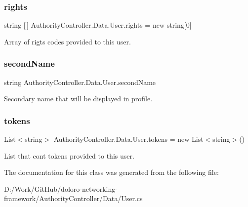 \mbox{\label{class_authority_controller_1_1_data_1_1_user_a750e743023fd2e3b7d22cffd1729c4d3}} 
\subsubsection{\texorpdfstring{rights}{rights}}
{\footnotesize\ttfamily string \mbox{[}$\,$\mbox{]} Authority\+Controller.\+Data.\+User.\+rights = new string\mbox{[}0\mbox{]}}



Array of rigts\textquotesingle{} codes provided to this user. 

\mbox{\label{class_authority_controller_1_1_data_1_1_user_a7e06ede3b1eb9d24537f530d84129931}} 
\subsubsection{\texorpdfstring{second\+Name}{secondName}}
{\footnotesize\ttfamily string Authority\+Controller.\+Data.\+User.\+second\+Name}



Secondary name that will be displayed in profile. 

\mbox{\label{class_authority_controller_1_1_data_1_1_user_a881f9d9beaa89819daf95838bdc5a984}} 
\subsubsection{\texorpdfstring{tokens}{tokens}}
{\footnotesize\ttfamily List$<$string$>$ Authority\+Controller.\+Data.\+User.\+tokens = new List$<$string$>$()}



List that cont tokens provided to this user. 



The documentation for this class was generated from the following file\+:\begin{DoxyCompactItemize}
\item 
D\+:/\+Work/\+Git\+Hub/doloro-\/networking-\/framework/\+Authority\+Controller/\+Data/User.\+cs\end{DoxyCompactItemize}
